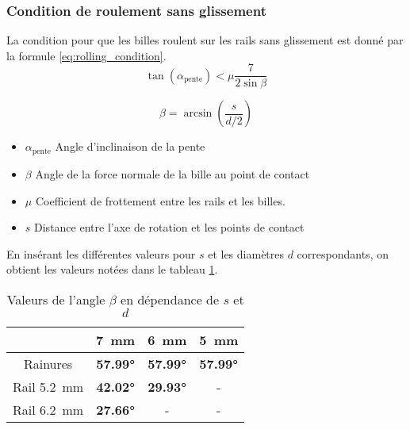 \subsubsection{Condition de roulement sans glissement}
La condition pour que les billes roulent sur les rails sans glissement est donné par la formule \ref{eq:rolling_condition}.
\begin{equation}
    \tan(\alpha_{\text{pente}}) < \mu \frac{7}{2\sin{\beta}}
    \label{eq:rolling_condition}
\end{equation}

\[\beta = \arcsin\left(\frac{s}{d/2}\right)\]


\begin{itemize}[label={}, noitemsep]
	\item $\alpha_{\text{pente}}$ \tabto{\tabtoX} Angle d'inclinaison de la pente
	\item $\beta$ \tabto{\tabtoX} Angle de la force normale de la bille au point de contact
	\item $\mu$ \tabto{\tabtoX} Coefficient de frottement entre les rails et les billes.
	\item $s$ \tabto{\tabtoX} Distance entre l'axe de rotation et les points de contact
\end{itemize}

En insérant les différentes valeurs pour $s$ et les diamètres $d$ correspondants, on obtient les valeurs notées dans le tableau \ref{tab:beta_sphere}.

\begin{table}[htbp]
    \centering
    \begin{tabular}{|c|c|c|c|}
        \hline
         & \SI{7}{\mm} & \SI{6}{\mm} & \SI{5}{\mm} \\
        \hline
        Rainures & \textbf{\ang{57.99}} & \textbf{\ang{57.99}} & \textbf{\ang{57.99}} \\
        \hline
        Rail \SI{5.2}{\mm}& \textbf{\ang{42.02}} & \textbf{\ang{29.93}} & - \\
        \hline
        Rail \SI{6.2}{\mm}& \textbf{\ang{27.66}} & - & - \\
        \hline
    \end{tabular}
    \caption{Valeurs de l'angle $\beta$ en dépendance de $s$ et $d$}
    \label{tab:beta_sphere}
\end{table}

